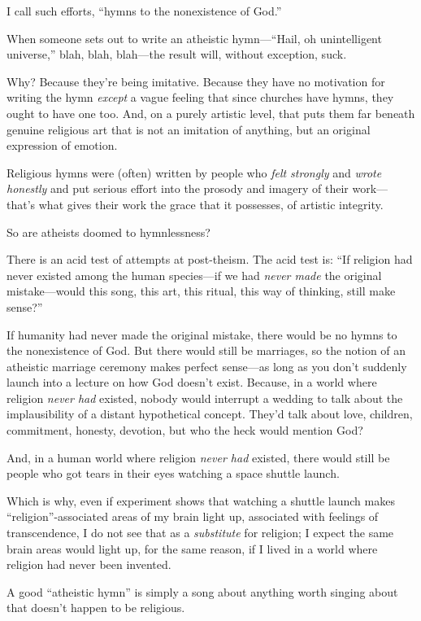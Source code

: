 {
 I call such efforts, ``hymns to the nonexistence
of God.''}

{
 When someone sets out to write an atheistic
hymn---``Hail, oh unintelligent
universe,'' blah, blah, blah---the result will,
without exception, suck.}

{
 Why? Because they're being imitative. Because they
have no motivation for writing the hymn \textit{except} a vague feeling
that since churches have hymns, they ought to have one too. And, on a
purely artistic level, that puts them far beneath genuine religious art
that is not an imitation of anything, but an original expression of
emotion.}

{
 Religious hymns were (often) written by people who \textit{felt
strongly} and \textit{wrote honestly} and put serious effort into the
prosody and imagery of their work---that's what gives
their work the grace that it possesses, of artistic integrity.}

{
 So are atheists doomed to hymnlessness?}

{
 There is an acid test of attempts at post-theism. The acid test
is: ``If religion had never existed among the human
species---if we had \textit{never made} the original mistake---would
this song, this art, this ritual, this way of thinking, still make
sense?''}

{
 If humanity had never made the original mistake, there would be no
hymns to the nonexistence of God. But there would still be marriages,
so the notion of an atheistic marriage ceremony makes perfect
sense---as long as you don't suddenly launch into a
lecture on how God doesn't exist. Because, in a world
where religion \textit{never had} existed, nobody would interrupt a
wedding to talk about the implausibility of a distant hypothetical
concept. They'd talk about love, children, commitment,
honesty, devotion, but who the heck would mention God?}

{
 And, in a human world where religion \textit{never had} existed,
there would still be people who got tears in their eyes watching a
space shuttle launch.}

{
 Which is why, even if experiment shows that watching a shuttle
launch makes ``religion''-associated
areas of my brain light up, associated with feelings of transcendence,
I do not see that as a \textit{substitute} for religion; I expect the
same brain areas would light up, for the same reason, if I lived in a
world where religion had never been invented.}

{
 A good ``atheistic hymn'' is
simply a song about anything worth singing about that
doesn't happen to be religious.}


